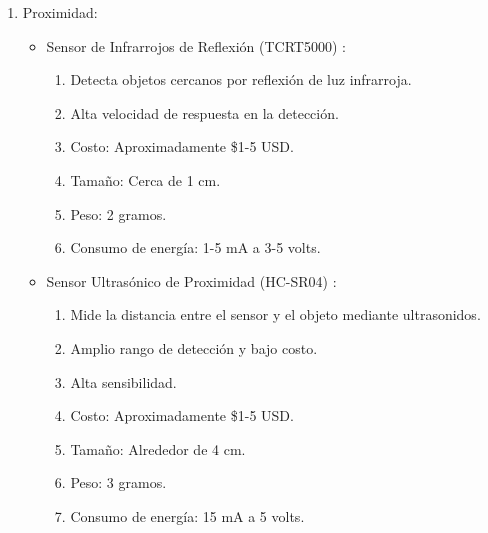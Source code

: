 \begin{enumerate}
\item Proximidad:
\begin{itemize}
    \item Sensor de Infrarrojos de Reflexión (TCRT5000) \cite{96}:
\begin{enumerate}
        \item Detecta objetos cercanos por reflexión de luz infrarroja.
        \item Alta velocidad de respuesta en la detección.
        \item Costo: Aproximadamente \$1-5 USD.
        \item Tamaño: Cerca de 1 cm.
        \item Peso: 2 gramos.
        \item Consumo de energía: 1-5 mA a 3-5 volts.
\end{enumerate}
    \item Sensor Ultrasónico de Proximidad (HC-SR04) \cite{97}:
\begin{enumerate}
        \item Mide la distancia entre el sensor y el objeto mediante ultrasonidos.
        \item Amplio rango de detección y bajo costo.
        \item Alta sensibilidad.
        \item Costo: Aproximadamente \$1-5 USD.
        \item Tamaño: Alrededor de 4 cm.
        \item Peso: 3 gramos.
        \item Consumo de energía: 15 mA a 5 volts.

\end{enumerate}
\end{itemize}


\end{enumerate}

